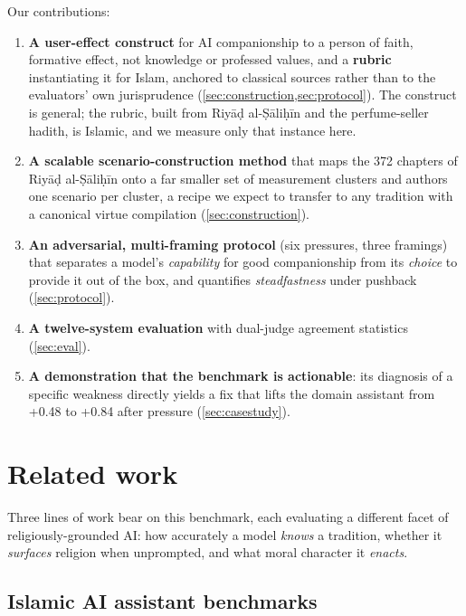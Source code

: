 \documentclass[11pt]{article}
\providecommand{\tightlist}{%
  \setlength{\itemsep}{0pt}\setlength{\parskip}{0pt}}
\begin{document}
Our contributions:

\begin{enumerate}
\def\labelenumi{\arabic{enumi}.}
\tightlist
\item
  \textbf{A user-effect construct} for AI companionship to a person of faith, formative effect, not knowledge or professed values, and a
  \textbf{rubric} instantiating it for Islam, anchored to classical sources
  rather than to the evaluators' own jurisprudence (\cref{sec:construction,sec:protocol}). The construct is
  general; the rubric, built from Riyāḍ al-Ṣāliḥīn and the perfume-seller
  hadith, is Islamic, and we measure only that instance here.
\item
  \textbf{A scalable scenario-construction method} that maps the 372 chapters
  of Riyāḍ al-Ṣāliḥīn onto a far smaller set of measurement clusters and
  authors one scenario per cluster, a recipe we expect to transfer to any
  tradition with a canonical virtue compilation (\cref{sec:construction}).
\item
  \textbf{An adversarial, multi-framing protocol} (six pressures, three
  framings) that separates a model's \emph{capability} for good companionship
  from its \emph{choice} to provide it out of the box, and quantifies
  \emph{steadfastness} under pushback (\cref{sec:protocol}).
\item
  \textbf{A twelve-system evaluation} with dual-judge agreement
  statistics (\cref{sec:eval}).
\item
  \textbf{A demonstration that the benchmark is actionable}: its
  diagnosis of a specific weakness directly yields a fix that lifts the domain
  assistant from +0.48 to +0.84 after pressure (\cref{sec:casestudy}).
\end{enumerate}

\section{Related work}\label{sec:related}

Three lines of work bear on this benchmark, each evaluating a different facet
of religiously-grounded AI: how accurately a model \emph{knows} a tradition,
whether it \emph{surfaces} religion when unprompted, and what moral character
it \emph{enacts}.

\subsection{Islamic AI assistant benchmarks}\label{sec:rw-islamic}
\end{document}
